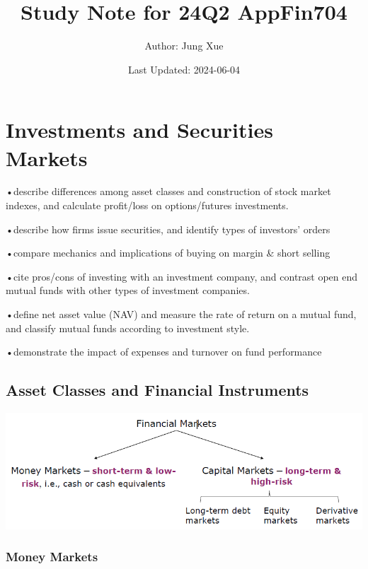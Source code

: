 \documentclass[
]{book}
\title{Study Note for 24Q2 AppFin704}
\author{Author: Jung Xue}
\date{Last Updated: 2024-06-04}
\begin{document}
\maketitle

{
\setcounter{tocdepth}{1}
\tableofcontents
}
\hypertarget{ch1}{%
\chapter{Investments and Securities Markets}\label{ch1}}

•describe differences among asset classes and construction of stock market indexes, and calculate profit/loss on options/futures investments.

•describe how firms issue securities, and identify types of investors' orders

•compare mechanics and implications of buying on margin \& short selling

•cite pros/cons of investing with an investment company, and contrast open end mutual funds with other types of investment companies.

•define net asset value (NAV) and measure the rate of return on a mutual fund, and classify mutual funds according to investment style.

•demonstrate the impact of expenses and turnover on fund performance

\hypertarget{asset-classes-and-financial-instruments}{%
\section{Asset Classes and Financial Instruments}\label{asset-classes-and-financial-instruments}}

\includegraphics{Resources/Financialmarkets.png}

\hypertarget{money-markets}{%
\subsection{Money Markets}\label{money-markets}}
\end{document}
